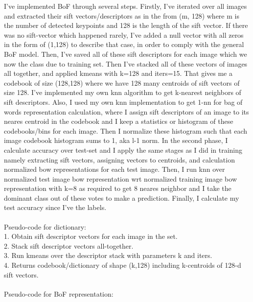 \documentclass[12pt]{article}
\begin{document}
    \begin{center}
        \raggedright
        I've implemented BoF through several steps. Firstly, I've iterated over all images and extracted their sift vectors/descriptors as in the from (m, 128) where m is the number of detected keypoints and 128 is the length of the sift vector.
        If there was no sift-vector which happened rarely, I've added a null vector with all zeros in the form of (1,128) to describe that case, in order to comply with the general BoF model.
        Then, I've saved all of these sift descriptors for each image which we now the class due to training set. Then I've stacked all of these vectors of images all together, and applied kmeans with k=128 and iters=15.
        That gives me a codebook of size (128,128) where we have 128 many centroids of sift vectors of size 128.
        I've implemented my own knn algorithm to get k-nearest neighbors of sift descriptors.
        Also, I used my own knn implementation to get 1-nn for bag of words representation calculation, where I assign sift descriptors of an image to its neares centroid in the codebook 
        and I keep a statistics or histogram of these codebooks/bins for each image.
        Then I normalize these histogram such that each image codebook histogram sums to 1, aka l-1 norm.
        In the second phase, I calculate accuracy over test-set and I apply the same stages as I did in training namely
        extracting sift vectors, assigning vectors to centroids, and calculation normalized bow representations for each test image.
        Then, I run knn over normalized test image bow representation wrt normalized training image bow representation with k=8 as required to get 8 neares neighbor 
        and I take the dominant class out of these votes to make a prediction. Finally, I calculate my test accuracy since I've the labels.
        \\~\\
        Pseudo-code for dictionary: \\
        1. Obtain sift descriptor vectors for each image in the set. \\
        2. Stack sift descriptor vectors all-together. \\
        3. Run kmeans over the descriptor stack with parameters k and iters. \\
        4. Returns codebook/dictionary of shape (k,128) including k-centroids of 128-d sift vectors.
        \\~\\
        Pseudo-code for BoF representation: \\

\end{center}
\end{document}
